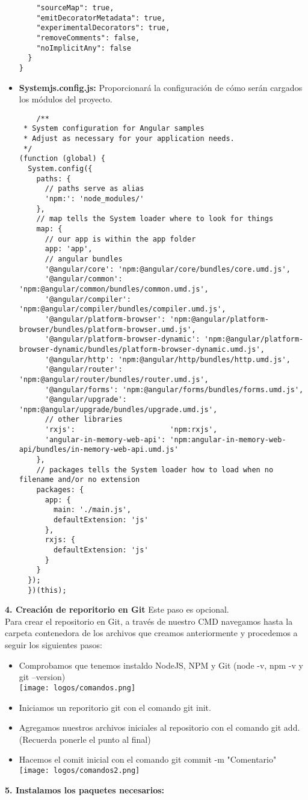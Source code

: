 \documentclass[openany]{book}
\begin{document}
\begin{itemize}
\begin{lstlisting}
    "sourceMap": true,
    "emitDecoratorMetadata": true,
    "experimentalDecorators": true,
    "removeComments": false,
    "noImplicitAny": false
  }
}
\end{lstlisting}
  \item \textbf{Systemjs.config.js:} Proporcionará la configuración de cómo serán cargados los módulos del proyecto.
  \begin{lstlisting}
    /**
 * System configuration for Angular samples
 * Adjust as necessary for your application needs.
 */
(function (global) {
  System.config({
    paths: {
      // paths serve as alias
      'npm:': 'node_modules/'
    },
    // map tells the System loader where to look for things
    map: {
      // our app is within the app folder
      app: 'app',
      // angular bundles
      '@angular/core': 'npm:@angular/core/bundles/core.umd.js',
      '@angular/common': 'npm:@angular/common/bundles/common.umd.js',
      '@angular/compiler': 'npm:@angular/compiler/bundles/compiler.umd.js',
      '@angular/platform-browser': 'npm:@angular/platform-browser/bundles/platform-browser.umd.js',
      '@angular/platform-browser-dynamic': 'npm:@angular/platform-browser-dynamic/bundles/platform-browser-dynamic.umd.js',
      '@angular/http': 'npm:@angular/http/bundles/http.umd.js',
      '@angular/router': 'npm:@angular/router/bundles/router.umd.js',
      '@angular/forms': 'npm:@angular/forms/bundles/forms.umd.js',
      '@angular/upgrade': 'npm:@angular/upgrade/bundles/upgrade.umd.js',
      // other libraries
      'rxjs':                      'npm:rxjs',
      'angular-in-memory-web-api': 'npm:angular-in-memory-web-api/bundles/in-memory-web-api.umd.js'
    },
    // packages tells the System loader how to load when no filename and/or no extension
    packages: {
      app: {
        main: './main.js',
        defaultExtension: 'js'
      },
      rxjs: {
        defaultExtension: 'js'
      }
    }
  });
  })(this);
  \end{lstlisting}
  \vspace*{5\baselineskip}
\end{itemize}
\textbf{4. Creación de reporitorio en Git} Este paso es opcional.
\\ Para crear el repositorio en Git, a través de nuestro CMD navegamos hasta la carpeta contenedora de los archivos que creamos anteriormente y procedemos a seguir los siguientes pasos: 
\begin{itemize}
  \item Comprobamos que tenemos instaldo NodeJS, NPM y Git (node -v, npm -v y git --version)
  \\ \texttt{[image: logos/comandos.png]}\\
  \item Iniciamos un reporitorio git con el comando git init.
  \item Agregamos nuestros archivos iniciales al repositorio con el comando git add. (Recuerda ponerle el punto al final)
  \item Hacemos el comit inicial con el comando git commit -m "Comentario"
  \\ \texttt{[image: logos/comandos2.png]}
\end{itemize}
\textbf{5. Instalamos los paquetes necesarios: }
\end{document}
